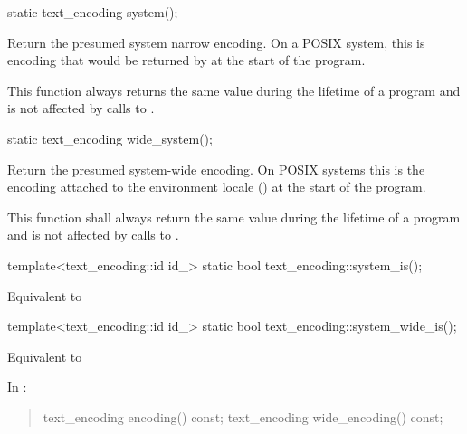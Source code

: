 \documentclass{wg21}
\begin{document}
\begin{addedblock}
\begin{itemdecl}
static text_encoding system();
\end{itemdecl}

\begin{itemdescr}
Return the presumed system narrow encoding.
On a POSIX system, this is encoding that would be returned by  at the start of the program.

This function always returns the same value during the lifetime of a program and is not affected by calls to .
\end{itemdescr}

\begin{itemdecl}
static text_encoding wide_system();
\end{itemdecl}

\begin{itemdescr}
Return the presumed system-wide encoding.
On POSIX systems this is the encoding attached to the environment locale () at the start of the program.

\begin{note}
This function shall always return the same value during the lifetime of a program and is not affected by calls to .
\end{note}
\end{itemdescr}

\begin{itemdecl}
template<text_encoding::id id_>
static bool text_encoding::system_is();
\end{itemdecl}

\begin{itemdescr}
\returns Equivalent to 
\end{itemdescr}

\begin{itemdecl}
template<text_encoding::id id_>
static bool text_encoding::system_wide_is();
\end{itemdecl}

\begin{itemdescr}
\returns Equivalent to 
\end{itemdescr}


\end{addedblock}

In \tcode{[locale]}:

\begin{quote}
\begin{codeblock}
namespace std {
  class locale {
  public:
    [...]

    // locale operations
    string name() const;
\end{codeblock}
\begin{addedblock}
\begin{codeblock}
    text_encoding encoding() const;
    text_encoding wide_encoding() const;
\end{codeblock}
\end{addedblock}
\begin{codeblock}
  };
}
\end{codeblock}
\end{quote}
\end{document}
